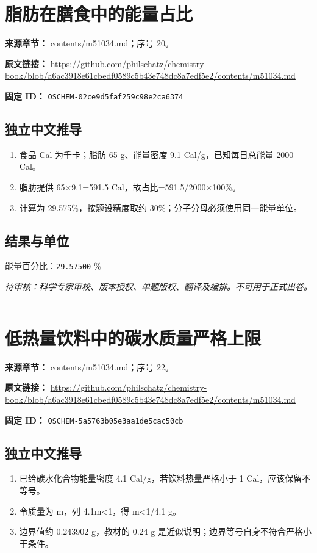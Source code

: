 \documentclass[UTF8,11pt,oneside,openany,fontset=none]{ctexbook}
\begin{document}
\section{脂肪在膳食中的能量占比}
\noindent\textbf{来源章节：} contents/m51034.md；序号 20。\par
\noindent\textbf{原文链接：} \url{https://github.com/philschatz/chemistry-book/blob/a6ac3918e61cbedf0589c5b43e748dc8a7edf5e2/contents/m51034.md}\par
\noindent\textbf{固定 ID：} \texttt{OSCHEM-02ce9d5faf259c98e2ca6374}\par
\subsection*{独立中文推导}
\begin{enumerate}
\item 食品 Cal 为千卡；脂肪 65 g、能量密度 9.1 Cal/g，已知每日总能量 2000 Cal。
\item 脂肪提供 65×9.1=591.5 Cal，故占比=591.5/2000×100\%。
\item 计算为 29.575\%，按题设精度取约 30\%；分子分母必须使用同一能量单位。
\end{enumerate}
\subsection*{结果与单位}
\noindent 能量百分比：\texttt{29.57500} \%\par
\noindent\textit{待审核：科学专家审校、版本授权、单题版权、翻译及编排。不可用于正式出卷。}
\medskip\hrule\medskip
\section{低热量饮料中的碳水质量严格上限}
\noindent\textbf{来源章节：} contents/m51034.md；序号 22。\par
\noindent\textbf{原文链接：} \url{https://github.com/philschatz/chemistry-book/blob/a6ac3918e61cbedf0589c5b43e748dc8a7edf5e2/contents/m51034.md}\par
\noindent\textbf{固定 ID：} \texttt{OSCHEM-5a5763b05e3aa1de5cac50cb}\par
\subsection*{独立中文推导}
\begin{enumerate}
\item 已给碳水化合物能量密度 4.1 Cal/g，若饮料热量严格小于 1 Cal，应该保留不等号。
\item 令质量为 m，列 4.1m<1，得 m<1/4.1 g。
\item 边界值约 0.243902 g，教材的 0.24 g 是近似说明；边界等号自身不符合严格小于条件。
\end{enumerate}
\end{document}

